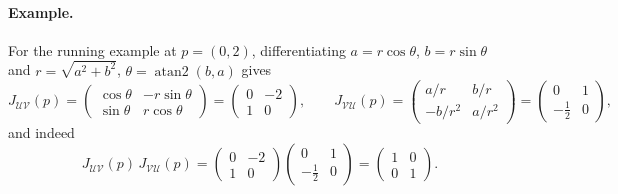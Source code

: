 \documentclass[11pt]{article}
\begin{document}
\paragraph{Example.} For the running example at $p=(0,2)$, differentiating $a=r\cos\theta$, $b=r\sin\theta$ and $r=\sqrt{a^2+b^2}$, $\theta=\operatorname{atan2}(b,a)$ gives
\[
J_{\mathcal{UV}}(p)=\begin{pmatrix}\cos\theta&-r\sin\theta\\\sin\theta&r\cos\theta\end{pmatrix}=\begin{pmatrix}0&-2\\1&0\end{pmatrix},\qquad
J_{\mathcal{VU}}(p)=\begin{pmatrix}a/r&b/r\\-b/r^2&a/r^2\end{pmatrix}=\begin{pmatrix}0&1\\-\tfrac12&0\end{pmatrix},
\]
and indeed
\[
J_{\mathcal{UV}}(p)\,J_{\mathcal{VU}}(p)=\begin{pmatrix}0&-2\\1&0\end{pmatrix}\begin{pmatrix}0&1\\-\tfrac12&0\end{pmatrix}=\begin{pmatrix}1&0\\0&1\end{pmatrix}.
\]
\end{document}
